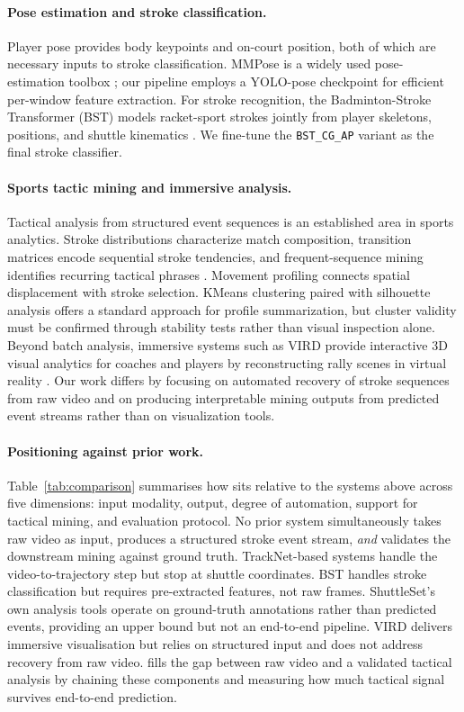 \paragraph{Pose estimation and stroke classification.}
Player pose provides body keypoints and on-court position, both of which are
necessary inputs to stroke classification. MMPose is a widely used
pose-estimation toolbox \cite{mmpose}; our pipeline employs a YOLO-pose
checkpoint for efficient per-window feature extraction. For stroke recognition,
the Badminton-Stroke Transformer (BST) models racket-sport strokes jointly from
player skeletons, positions, and shuttle kinematics \cite{chang2025bst}.
We fine-tune the \texttt{BST\_CG\_AP} variant as the final stroke classifier.

\paragraph{Sports tactic mining and immersive analysis.}
Tactical analysis from structured event sequences is an established area in
sports analytics. Stroke distributions characterize match composition,
transition matrices encode sequential stroke tendencies, and frequent-sequence
mining identifies recurring tactical phrases \cite{shuttleset}. Movement
profiling connects spatial displacement with stroke selection. KMeans clustering
\cite{kmeans} paired with silhouette analysis \cite{silhouette} offers a
standard approach for profile summarization, but cluster validity must be
confirmed through stability tests rather than visual inspection alone. Beyond
batch analysis, immersive systems such as VIRD provide interactive 3D visual
analytics for coaches and players by reconstructing rally scenes in virtual
reality \cite{vird2023}. Our work differs by focusing on automated recovery of
stroke sequences from raw video and on producing interpretable mining outputs
from predicted event streams rather than on visualization tools.

\paragraph{Positioning \method{} against prior work.}
Table~\ref{tab:comparison} summarises how \method{} sits relative to the
systems above across five dimensions: input modality, output, degree of
automation, support for tactical mining, and evaluation protocol. No prior
system simultaneously takes raw video as input, produces a structured stroke
event stream, \emph{and} validates the downstream mining against ground truth.
TrackNet-based systems handle the video-to-trajectory step but stop at shuttle
coordinates. BST handles stroke classification but requires pre-extracted
features, not raw frames. ShuttleSet's own analysis tools operate on
ground-truth annotations rather than predicted events, providing an upper bound
but not an end-to-end pipeline. VIRD delivers immersive visualisation but
relies on structured input and does not address recovery from raw video.
\method{} fills the gap between raw video and a validated tactical analysis by
chaining these components and measuring how much tactical signal survives
end-to-end prediction.

